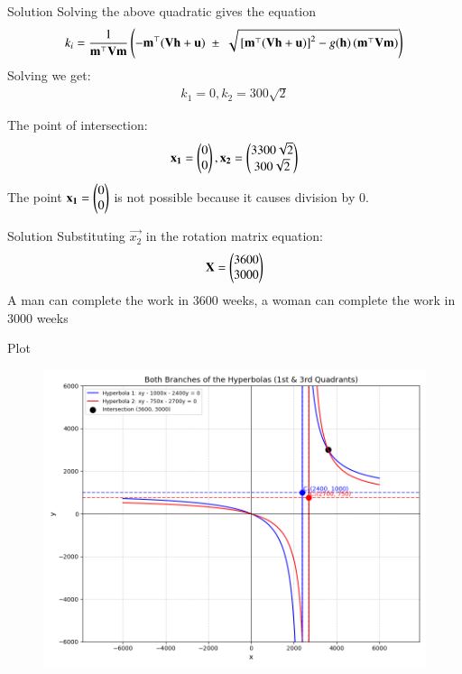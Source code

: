 \documentclass{beamer}
\begin{document}
\begin{frame}{Solution}
Solving the above quadratic gives the equation
\begin{align}
k_i = \frac{1}{\mathbf{m}^{\top}\mathbf{V}\mathbf{m}}
\left(
    -\mathbf{m}^{\top} (\mathbf{V}\mathbf{h} + \mathbf{u})
    \;\pm\;
    \sqrt{ {}\left[\mathbf{m}^{\top}(\mathbf{V}\mathbf{h} + \mathbf{u})\right]^2
    - g(\mathbf{h}) \, (\mathbf{m}^{\top}\mathbf{V}\mathbf{m}) }
    \right)
\end{align}
Solving we get:
\begin{align}
k_1 = 0, k_2 = 300\sqrt{2}
\end{align}

The point of intersection:
\begin{align}
\mathbf{x_1} = \begin{pmatrix}0 \\ 0\end{pmatrix}, \mathbf{x_2} = \begin{pmatrix}3300\sqrt{2} \\ 300\sqrt{2}\end{pmatrix}
\end{align}
The point $\mathbf{x_1} = \begin{pmatrix}0 \\ 0\end{pmatrix}$ is not possible because it causes division by 0.\\
\end{frame}
\begin{frame}{Solution}
Substituting $\vec{x_2}$ in the rotation matrix equation:
\begin{align}
\mathbf{X} = \begin{pmatrix}3600 \\ 3000\end{pmatrix}
\end{align}
A man can complete the work in 3600 weeks, a woman can complete the work in 3000 weeks
\end{frame}
\begin{frame}{Plot}

\begin{figure}[h!]
    \centering
    \includegraphics[height=0.5\textheight, keepaspectratio]{figs/Figure_1.png}
    \label{figure_1}
\end{figure}
\end{frame} 
\end{document}
